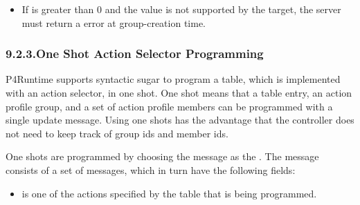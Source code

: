 \documentclass[11pt]{article}
\begin{document}
{\begin{itemize}
\begin{itemize}
\item{}
If  is greater than 0 and the value is not supported by the
target, the server must return a  error at
group-creation time.%
\end{itemize}%
\end{itemize}%

\subsubsection{9.2.3.\hspace*{0.5em}One Shot Action Selector Programming}\label{sec-oneshot}%

\noindent{}P4Runtime supports syntactic sugar to program a table, which is implemented with
an action selector, in one shot. One shot means that a table entry, an action
profile group, and a set of action profile members can be programmed with a
single update message. Using one shots has the advantage that the controller
does not need to keep track of group ids and member ids.%

One shots are programmed by choosing the  message as the
. The  message consists of a set of
 messages, which in turn have the following fields:%

\begin{itemize}%

\item{}
 is one of the actions specified by the table that is being
programmed.%


\end{itemize}}
\end{document}
